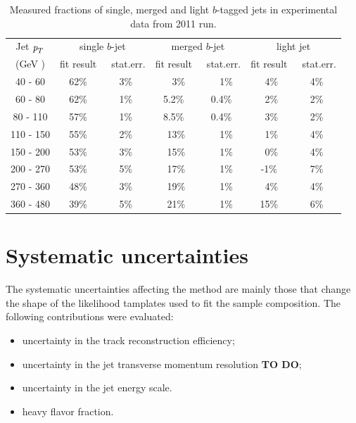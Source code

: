 \begin{table}[!hbt] %
\renewcommand{\arraystretch}{1.2}
\centering
\begin{tabular}{ | c || c | c || c | c || c | c ||}
  \hline
  Jet ${\emph{p}_{T}}$ & \multicolumn{2}{c||}{single $b$-jet} & \multicolumn{2}{c||}{merged $b$-jet} & \multicolumn{2}{c||}{~light jet~}\\ \cline{2-7}
    (GeV ) & fit result & ~stat.err. & fit result & ~stat.err. & fit result & ~stat.err.\\ \hline
   40 - 60 &  62\% &  3\%  &  ~~3\%  &  ~~1\% &  ~4\%  &  4\%   \\ 
   60 - 80 &  62\% &  1\%  &  5.2\%  &  0.4\% &  ~2\%  &  2\%   \\ 
   80 - 110&  57\% &  1\%  &  8.5\%  &  0.4\% &  ~3\%  &  2\%   \\ 
  110 - 150&  55\% &  2\%  &  ~13\%  &  ~~1\% &  ~1\%  &  4\%   \\ 
  150 - 200&  53\% &  3\%  &  ~15\%  &  ~~1\% &  ~0\%  &  4\%   \\ 
  200 - 270&  53\% &  5\%  &  ~17\%  &  ~~1\% &  -1\%  &  7\%   \\ 
  270 - 360&  48\% &  3\%  &  ~19\%  &  ~~1\% &  ~4\%  &  4\%   \\ 
  360 - 480&  39\% &  5\%  &  ~21\%  &  ~~1\% &  15\%  &  6\%   \\ \hline
\end{tabular}
\caption{Measured fractions of single, merged and light $b$-tagged jets in experimental data from 2011 run.}
\label{tb:fitfractions}
\end{table}







\section{Systematic uncertainties}\label{sec:FractionSystematics}




The systematic uncertainties affecting the method are mainly those that change the shape of the likelihood tamplates used to fit the sample composition. The following contributions were evaluated:

\begin{itemize}\addtolength{\itemsep}{-0.4\baselineskip}
\item
uncertainty in the track reconstruction efficiency;
\item
uncertainty in the jet transverse momentum resolution {\bf TO DO};
\item
uncertainty in the jet energy scale.
\item
heavy flavor fraction.
\end{itemize}


